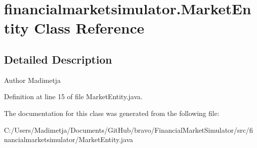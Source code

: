 \hypertarget{classfinancialmarketsimulator_1_1_market_entity}{\section{financialmarketsimulator.\+Market\+Entity Class Reference}
\label{classfinancialmarketsimulator_1_1_market_entity}
}


\subsection{Detailed Description}
\begin{DoxyAuthor}{Author}
Madimetja 
\end{DoxyAuthor}


Definition at line 15 of file Market\+Entity.\+java.



The documentation for this class was generated from the following file\+:\begin{DoxyCompactItemize}
\item 
C\+:/\+Users/\+Madimetja/\+Documents/\+Git\+Hub/bravo/\+Financial\+Market\+Simulator/src/financialmarketsimulator/Market\+Entity.\+java\end{DoxyCompactItemize}
